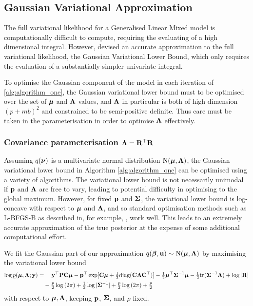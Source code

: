 \documentclass{amsart}[12pt]
\begin{document}
			\subsection{Gaussian Variational Approximation}
					
					
			The full variational likelihood for a Generalised Linear Mixed model is computationally difficult to
			compute, requiring the evaluating of a high dimensional integral. However, \citep{Ormerod2012} devised
			an accurate approximation to the full variational likelihood, the Gaussian Variational Lower Bound,
			which only requires the evaluation of a substantially simpler univariate integral.
				
			To optimise the Gaussian component of the model in each iteration of \ref{alg:algorithm_one}, the Gaussian variational lower bound must to be optimised over the set of ${\boldsymbol \mu}$ and ${\boldsymbol \Lambda}$
			values, and ${\boldsymbol \Lambda}$ in particular is both of high dimension $(p + mb)^2$ and constrained to be
			semi-positive definite. Thus care must be taken in the parameterisation in order to optimise
			${\boldsymbol \Lambda}$ effectively.
				
			\subsubsection{Covariance parameterisation ${\boldsymbol \Lambda} = {\bf R}^\top {\bf R}$}
			
			Assuming $q({\boldsymbol \nu})$ is a multivariate normal distribution $\text{N}({\boldsymbol \mu}, {\boldsymbol \Lambda})$, the Gaussian variational lower
			bound in Algorithm \ref{alg:algorithm_one} can be optimised using a variety of algorithms. The variational
			lower bound is not necessarily unimodal if ${\bf p}$ and ${\boldsymbol \Lambda}$ are free to vary, leading to potential
			difficulty in optimising to the global maximum. However, for fixed ${\bf p}$ and ${\boldsymbol \Sigma}$, the variational
			lower bound is log-concave with respect to ${\boldsymbol \mu}$ and ${\boldsymbol \Lambda}$, and so standard optimisation methods such
			as L-BFGS-B as described in, for example, \citep{Liu1989}, work well. This leads to an extremely accurate
			approximation of the true posterior at the expense of some additional computational effort.
					
			We fit the Gaussian part of our approximation $q({\boldsymbol \beta}, {\bf u}) \sim \text{N}({\boldsymbol \mu}, {\boldsymbol \Lambda})$ by maximising 
			the variational lower bound	
			\begin{align*}
				\log \underline{p}({\boldsymbol \mu}, {\boldsymbol \Lambda}; {\bf y}) & = \quad {\bf y}^\top{\bf P} {\bf C} {\boldsymbol\mu} - {\bf p}^\top \exp[{\bf C} {\boldsymbol \mu} + \tfrac{1}{2} \text{diag}({\bf C} {\boldsymbol \Lambda} {\bf C}^\top)] - \tfrac{1}{2} {\boldsymbol \mu}^\top {\boldsymbol\Sigma}^{-1} {\boldsymbol \mu} - \tfrac{1}{2} \text{tr}{({\boldsymbol\Sigma}^{-1} {\boldsymbol\Lambda})} + \log{|{\bf R}|} \\
				                                        & \quad - \tfrac{p}{2} \log{(2 \pi)} + \tfrac{1}{2} \log{|{\boldsymbol\Sigma}^{-1}|} + \tfrac{p}{2} \log{(2 \pi)} + \tfrac{p}{2}                                                                              
			\end{align*}
			\noindent with respect to ${\boldsymbol \mu}, {\boldsymbol \Lambda}$, keeping ${\bf p}$, ${\boldsymbol \Sigma}$, and $\rho$ fixed.
					
\end{document}
